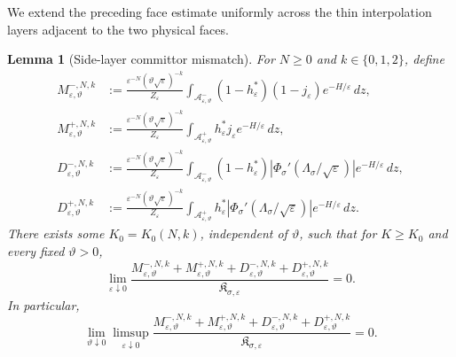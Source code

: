 \documentclass[11pt]{article}
\numberwithin{equation}{section}
\theoremstyle{plain}
\newtheorem{lemma}[theorem]{Lemma}
\theoremstyle{definition}
\theoremstyle{remark}
\newcommand{\eps}{\varepsilon}
\begin{document}
We extend the preceding face estimate uniformly across the thin
interpolation layers adjacent to the two physical faces.

\begin{lemma}[Side-layer committor mismatch]
\label{lem:side-layer-mismatch}
For $N\ge0$ and $k\in\{0,1,2\}$, define
\[
\begin{aligned}
M_{\eps,\vartheta}^{-,N,k}
&:=\frac{\eps^{-N}(\vartheta\sqrt\eps)^{-k}}{Z_\eps}
\int_{\mathcal A_{\eps,\vartheta}^-}
(1-h_\eps^*)(1-j_\eps)e^{-H/\eps}\,dz,\\
M_{\eps,\vartheta}^{+,N,k}
&:=\frac{\eps^{-N}(\vartheta\sqrt\eps)^{-k}}{Z_\eps}
\int_{\mathcal A_{\eps,\vartheta}^+}
h_\eps^*j_\eps e^{-H/\eps}\,dz,\\
D_{\eps,\vartheta}^{-,N,k}
&:=\frac{\eps^{-N}(\vartheta\sqrt\eps)^{-k}}{Z_\eps}
\int_{\mathcal A_{\eps,\vartheta}^-}
(1-h_\eps^*)
\left|\Phi_\sigma'(\Lambda_\sigma/\sqrt\eps)\right|
e^{-H/\eps}\,dz,\\
D_{\eps,\vartheta}^{+,N,k}
&:=\frac{\eps^{-N}(\vartheta\sqrt\eps)^{-k}}{Z_\eps}
\int_{\mathcal A_{\eps,\vartheta}^+}
h_\eps^*
\left|\Phi_\sigma'(\Lambda_\sigma/\sqrt\eps)\right|
e^{-H/\eps}\,dz.
\end{aligned}
\]
There exists some $K_0=K_0(N,k)$, independent of $\vartheta$, such that for
$K\ge K_0$ and every fixed $\vartheta>0$,
\[
\lim_{\eps\downarrow0}
\frac{M_{\eps,\vartheta}^{-,N,k}+M_{\eps,\vartheta}^{+,N,k}
+D_{\eps,\vartheta}^{-,N,k}+D_{\eps,\vartheta}^{+,N,k}}
{\mathfrak K_{\sigma,\eps}}=0.
\]
In particular,
\[
\lim_{\vartheta\downarrow0}\limsup_{\eps\downarrow0}
\frac{M_{\eps,\vartheta}^{-,N,k}+M_{\eps,\vartheta}^{+,N,k}
+D_{\eps,\vartheta}^{-,N,k}+D_{\eps,\vartheta}^{+,N,k}}
{\mathfrak K_{\sigma,\eps}}=0.
\]
\end{lemma}
\end{document}
